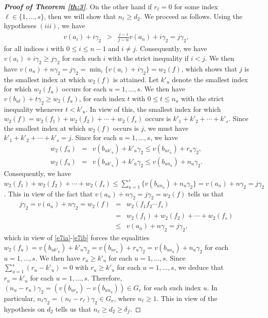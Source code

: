 \documentclass[12pt]{amsart}%
\begin{document}
\begin{proof}[\bf Proof of Theorem \ref{th:3}]
On the other hand if $r_\ell=0$ for some index $\ell\in \{1,\ldots, s\}$, then we  will show that  $n_\ell\geq d_2$. We proceed as follows. Using the hypotheses $(iii)$, we have \begin{eqnarray*}
v(a_i)+i\gamma_2&> & \frac{j-i}{j-n}v(a_n)+i\gamma_2=j\gamma_2,
\end{eqnarray*}
for all indices $i$ with $0\leq i\leq n-1$ and  $i\neq j$. Consequently, we have $v(a_i)+i\gamma_2\geq j\gamma_2$ for each such $i$ with the strict inequality if $i<j$. We then have $v(a_n)+n\gamma_2 =j\gamma_2=\min_i\{v(a_i)+i\gamma_2\}=w_2(f)$, which shows that $j$ is the smallest index at which $w_2(f)$ is attained.
Let $k'_u$ denote the smallest index for which $w_2(f_u)$ occurs for each $u=1, \ldots, s$. We then have
$v(b_{ut})+t\gamma_2\geq w_2(f_u)$,
for each index $t$ with $0\leq t \leq n_u$ with the strict inequality whenever $t<k'_u$. In view of this, the smallest index for which $w_2(f)= w_2(f_1)+w_2(f_2)+\cdots +w_2(f_s)$ occurs is $k'_1+k'_2+\cdots +k'_s$. Since the smallest index at which $w_2(f)$ occurs is $j$, we must have  $k'_1+k'_2+\cdots +k'_s=j$. Since for each $u=1, \ldots, s$, we have
\begin{eqnarray}\label{e7ia}
w_2(f_u)&=&v(b_{uk'_u})+k'_u\gamma_2\leq v(b_{ur_u})+r_u\gamma_2,\\
\label{e7ib}w_2(f_u)&=&v(b_{uk'_u})+k'_u\gamma_2\leq v(b_{un_u})+n_u\gamma_2.
\end{eqnarray}
 Consequently, we have $w_2(f_1)+w_2(f_2)+\cdots+w_2(f_s)\leq \sum_{u=1}^s\{v(b_{un_u})+n_u\gamma_2\}=v(a_n)+n\gamma_2=j\gamma_2$. This in view of the fact that $v(a_n)+n\gamma_2=j\gamma_2=w_2(f)$ tells us that
\begin{eqnarray*}
j\gamma_2=v(a_n)+n\gamma_2=w_2(f)&=&w_2(f_1f_2\cdots f_s)\\&=& w_2(f_1)+w_2(f_2)+\cdots+w_2(f_s)\\&\leq& v(a_n)+n\gamma_2=j\gamma_2,
\end{eqnarray*}
which in view of \eqref{e7ia}-\eqref{e7ib} forces the equalities $w_2(f_u)=v(b_{uk'_u})+k'_u\gamma_2=v(b_{ur_u})+r_u\gamma_2=v(b_{un_u})+n_u\gamma_2$ for each $u=1,\ldots, s$. We then have $r_u\geq k'_u$ for each $u=1,\ldots, s$. Since $\sum_{u=1}^{s}(r_u-k'_u) =0$ with $r_u\geq k'_u$ for each $u=1,\ldots, s$, we deduce that $r_u=k'_u$ for each $u=1, \ldots, s$. Therefore, $(n_u-r_u)\gamma_2=(v(b_{ur_u})-v(b_{un_u})) \in G_v$ for each such index $u$. In particular, $n_\ell\gamma_2=(n_\ell-r_\ell)\gamma_2\in G_v$, where $n_\ell\geq 1$. This in view of the hypothesis on $d_2$
tells us that $n_\ell\geq d_2\geq \delta_f$.
\end{proof}
\end{document}
